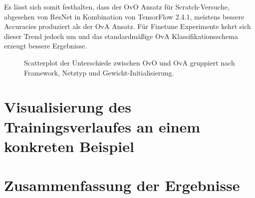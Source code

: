 Es lässt sich somit festhalten, dass der OvO Ansatz für Scratch-Versuche, abgesehen von ResNet in Kombination von TensorFlow \cite{tensorflow} 2.4.1, meistens bessere Accuracies produziert als der OvA Ansatz. Für Finetune Experimente kehrt sich dieser Trend jedoch um und das standardmäßige OvA Klassifikationsschema erzeugt bessere Ergebnisse.

\begin{figure}[H]
\begin{adjustbox}{width=1.4\textwidth, center}

\end{adjustbox}
\caption{Scatterplot der Unterschiede zwischen OvO und OvA gruppiert nach Framework, Netztyp und Gewicht-Initialisierung.}
\label{fig:ScatterplotGesamt}
\end{figure}

\section{Visualisierung des Trainingsverlaufes an einem konkreten Beispiel}

\section{Zusammenfassung der Ergebnisse}
